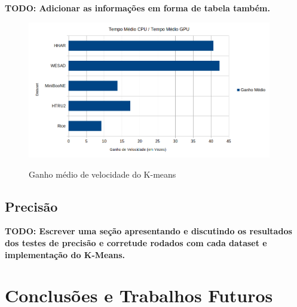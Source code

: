 \documentclass[12pt,
openright, 
oneside, %
a4paper,    %
brazil]{facom-ufu-abntex2}
\begin{document}
\textbf{TODO: Adicionar as informações em forma de tabela também.}

\begin{figure}[h]
  \caption{Ganho médio de velocidade do K-means}
  \centering
  \includegraphics[width=0.95\textwidth]{kMeansAvgSpeedup.png}
  \label{fig:kMeansAvgSpeedup}
\end{figure}





\section{Precisão}
\label{sec:testesDePrecisao}


\textbf{TODO: Escrever uma seção apresentando e discutindo os resultados dos testes de precisão e corretude rodados com cada dataset e implementação do K-Means.}






\chapter{Conclusões e Trabalhos Futuros}

\end{document}

